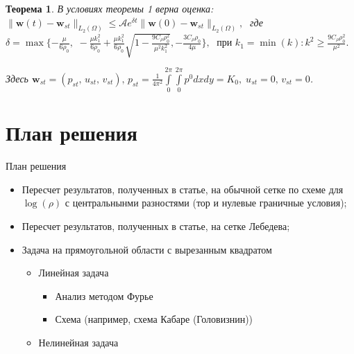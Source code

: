 \documentclass{beamer}
\newtheorem{Th}{Теорема}
\theoremstyle{plain}
\def\cfrac#1#2{\displaystyle{\frac{#1}{#2}}}
\begin{document}
\begin{frame}
\begin{Th}  В условиях теоремы 1 верна оценка:
$
\displaystyle \| \mathbf{w}(t) - \mathbf{w}_{st} \|_{L_2(\Omega)} \leqslant \mathcal{A} e^{ \delta t} \| \mathbf{w}(0) -\mathbf{w}_{st} \|_{L_2(\Omega)}, \;
$
где 
 $\delta = \max \{ -\frac{\mu}{6\rho_0},\,\, 
 - \frac{\mu k_1^2 }{6 \rho_0}
 + \frac{\mu k_1^2}{6 \rho_0} \sqrt{ 1    - \frac{9 C_\rho \rho_0^2 }{\mu^2 k_1^2} },
 - \cfrac{3 C_{{\rho}} {{\rho}_0}}{4 \mu} \}, \;
 \mbox{ при }   k_1 = \min (k) :  k^2 \ge  \frac{9 C_\rho \rho_0^2 }{\mu^2 }.
 $

Здесь 
$
\mathbf{w}_{st} = (p_{st},\, u_{st},\, v_{st}),\, 
p_{st}=\cfrac{1}{4\pi^2} \int \limits_0^{2\pi} \int \limits_0^{2\pi} p^0 dxdy = K_0, 
\; u_{st}=0,\, v_{st}=0$.
\end{Th}
	\end{frame}	
	
	\section{План решения}

	\begin{frame}{План решения}
	
		\begin{itemize}
			\item Пересчет результатов, полученных в статье, на обычной сетке по схеме для $\log (\rho)$ с центральнынми разностями (тор и нулевые граничные условия);
			\item Пересчет результатов, полученных в статье, на сетке Лебедева;
			\item Задача на прямоугольной области с вырезанным квадратом
			\begin{itemize}
				\item Линейная задача 
					\begin{itemize}
						\item Анализ методом Фурье
						\item Схема (например, схема Кабаре (Головизнин))
					\end{itemize}					 
				\item Нелинейная задача
			\end{itemize}
		\end{itemize}
			
	\end{frame}
	
\end{document}
